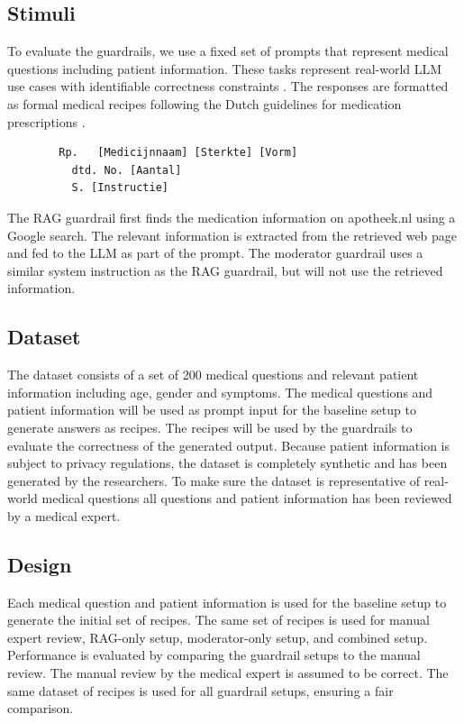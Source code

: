 \subsection{Stimuli}

To evaluate the guardrails, we use a fixed set of prompts that represent medical questions including patient information.
These tasks represent real-world LLM use cases with identifiable correctness constraints \citep{pais2024medication}.
The responses are formatted as formal medical recipes following the Dutch guidelines for medication prescriptions \citep{farmacotherapeutischkompas}.
\begin{verbatim}
        Rp.   [Medicijnnaam] [Sterkte] [Vorm]
          dtd. No. [Aantal]
          S. [Instructie]
\end{verbatim}

The RAG guardrail first finds the medication information on apotheek.nl using a Google search.
The relevant information is extracted from the retrieved web page and fed to the LLM as part of the prompt.
The moderator guardrail uses a similar system instruction as the RAG guardrail, but will not use the retrieved information.

\subsection{Dataset}

The dataset consists of a set of 200 medical questions and relevant patient information including age, gender and symptoms.
The medical questions and patient information will be used as prompt input for the baseline setup to generate answers as recipes.
The recipes will be used by the guardrails to evaluate the correctness of the generated output.
Because patient information is subject to privacy regulations, the dataset is completely synthetic and has been generated by the researchers.
To make sure the dataset is representative of real-world medical questions all questions and patient information has been reviewed by a medical expert.

\subsection{Design}

Each medical question and patient information is used for the baseline setup to generate the initial set of recipes.
The same set of recipes is used for manual expert review, RAG-only setup, moderator-only setup, and combined setup.
Performance is evaluated by comparing the guardrail setups to the manual review.
The manual review by the medical expert is assumed to be correct.
The same dataset of recipes is used for all guardrail setups, ensuring a fair comparison.

